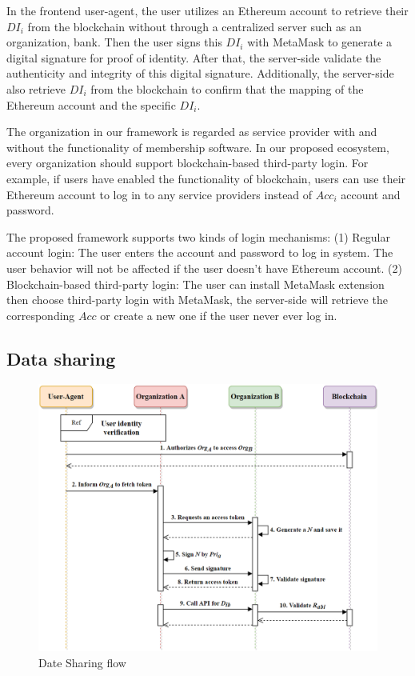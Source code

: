     In the frontend user-agent, the user utilizes an Ethereum account to retrieve their \(DI_i\) from the blockchain without through a centralized server such as an organization, bank. Then the user signs this \(DI_i\) with MetaMask to generate a digital signature for proof of identity. After that, the server-side validate the authenticity and integrity of this digital signature. Additionally, the server-side also retrieve \(DI_i\) from the blockchain to confirm that the mapping of the Ethereum account and the specific \(DI_i\).
    \par
    The organization in our framework is regarded as service provider with and without the functionality of membership software. In our proposed ecosystem, every organization should support blockchain-based third-party login. For example, if users have enabled the functionality of blockchain, users can use their Ethereum account to log in to any service providers instead of \(Acc_i\) account and password.
    \par 
    The proposed framework supports two kinds of login mechanisms: (1) Regular account login: The user enters the account and password to log in system. The user behavior will not be affected if the user doesn't have Ethereum account. (2) Blockchain-based third-party login: The user can install MetaMask extension then choose third-party login with MetaMask, the server-side will retrieve the corresponding \(Acc\) or create a new one if the user never ever log in.
      
    \newpage
    \subsection{Data sharing}
    \begin{figure}[htb]
        \centering
        \includegraphics[height=!,width=1\linewidth,keepaspectratio=true]{figures/data_sharing.png}
        \caption{{\footnotesize Date Sharing flow}}
        \label{fig:dataSharing}
    \end{figure}

